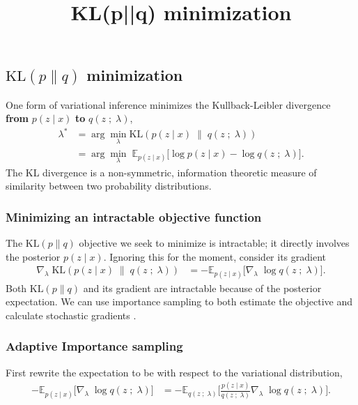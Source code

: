 \title{KL(p||q) minimization}

\subsection{$\text{KL}(p\|q)$ minimization}

One form of variational inference minimizes the Kullback-Leibler divergence
\textbf{from} $p(z \mid x)$ \textbf{to} $q(z\;;\;\lambda)$,
\begin{align*}
  \lambda^*
  &=
  \arg\min_\lambda \text{KL}(
  p(z \mid x)
  \;\|\;
  q(z\;;\;\lambda)
  )\\
  &=
  \arg\min_\lambda\;
  \mathbb{E}_{p(z \mid x)}
  \big[
  \log p(z \mid x)
  -
  \log q(z\;;\;\lambda)
  \big].
\end{align*}
The KL divergence is a non-symmetric, information theoretic measure of
similarity between two probability distributions.

\subsubsection{Minimizing an intractable objective function}

The $\text{KL}(p\|q)$ objective we seek to minimize is intractable; it directly
involves the posterior $p(z \mid x)$. Ignoring this for the moment, consider its
gradient
\begin{align*}
  \nabla_\lambda\;
  \text{KL}(
  p(z \mid x)
  \;\|\;
  q(z\;;\;\lambda)
  )
  &=
  -
  \mathbb{E}_{p(z \mid x)}
  \big[
  \nabla_\lambda\;
  \log q(z\;;\;\lambda)
  \big].
\end{align*}
Both $\text{KL}(p\|q)$ and its gradient are intractable
because of the posterior expectation.
We can use importance sampling to both
estimate the objective and calculate stochastic gradients
\citep{oh1992adaptive}.

\subsubsection{Adaptive Importance sampling}

First rewrite the expectation to be with respect to the variational
distribution,
\begin{align*}
  -
  \mathbb{E}_{p(z \mid x)}
  \big[
  \nabla_\lambda\;
  \log q(z\;;\;\lambda)
  \big]
  &=
  -
  \mathbb{E}_{q(z\;;\;\lambda)}
  \Bigg[
  \frac{p(z \mid x)}{q(z\;;\;\lambda)}
  \nabla_\lambda\;
  \log q(z\;;\;\lambda)
  \Bigg].
\end{align*}

